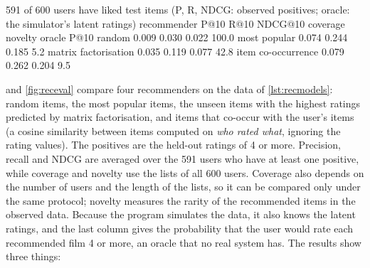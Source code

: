 \begin{pyoutput}
591 of 600 users have liked test items
(P, R, NDCG: observed positives; oracle: the simulator's latent ratings)
recommender           P@10   R@10   NDCG@10  coverage  novelty  oracle P@10
random                0.009  0.030  0.022    100.0%
most popular          0.074  0.244  0.185      5.2%
matrix factorisation  0.035  0.119  0.077     42.8%
item co-occurrence    0.079  0.262  0.204      9.5%
\end{pyoutput}

 and \cref{fig:receval} compare four recommenders on the data of \cref{lst:recmodels}: random items, the most
popular items, the unseen items with the highest ratings predicted by matrix factorisation, and items that co-occur with the
user's items (a cosine similarity between items computed on \emph{who rated what}, ignoring the rating values). The positives are the held-out ratings of 4 or more. Precision, recall and NDCG are
averaged over the 591 users who have at least one positive, while coverage and novelty use the lists of all 600 users. Coverage also depends on the number of users and the length
of the lists, so it can be compared only under the same protocol; novelty measures the rarity of the recommended items in the observed data. Because the program
simulates the data, it also knows the latent ratings, and the last column gives the probability that the user
would rate each recommended film 4 or more, an oracle that no real system has. The results show three things:
